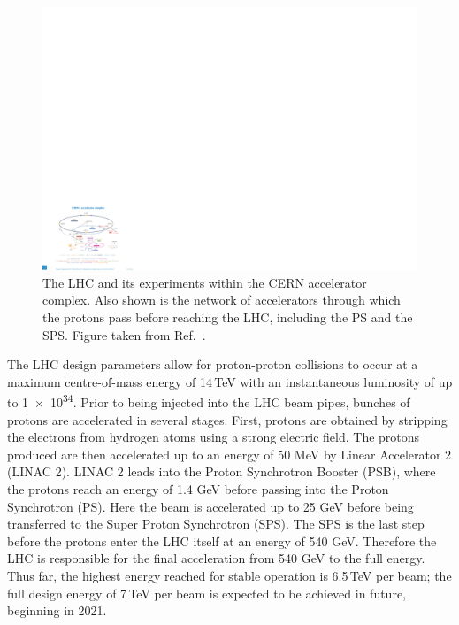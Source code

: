 \begin{figure}[h!]
  \centering
  \includegraphics[width=\textwidth]{Figures/Detector/CERNschematic.pdf}
  \caption[The CERN accelerator complex.]
  {
    The LHC and its experiments within the CERN accelerator complex.
    Also shown is the network of accelerators through which the protons pass before reaching the LHC, 
    including the PS and the SPS.
    Figure taken from Ref.~\cite{CERNcomplex}.
  }
  \label{fig:detector_CERNschematic}
\end{figure}

The LHC design parameters allow for proton-proton collisions to occur at a maximum centre-of-mass energy of 14\,TeV 
with an instantaneous luminosity of up to \SI{1e34}{\lumi}.
Prior to being injected into the LHC beam pipes, bunches of protons are accelerated in several stages. 
First, protons are obtained by stripping the electrons from hydrogen atoms using a strong electric field.
The protons produced are then accelerated up to an energy of 50 MeV by Linear Accelerator 2 (LINAC 2).
LINAC 2 leads into the Proton Synchrotron Booster (PSB), where the protons reach an energy of 1.4 GeV before passing into the Proton Synchrotron (PS).
Here the beam is accelerated up to 25 GeV before being transferred to the Super Proton Synchrotron (SPS).
The SPS is the last step before the protons enter the LHC itself at an energy of 540 GeV.
Therefore the LHC is responsible for the final acceleration from 540 GeV to the full energy.
Thus far, the highest energy reached for stable operation is 6.5\,TeV per beam; 
the full design energy of 7\,TeV per beam is expected to be achieved in future, beginning in 2021.

